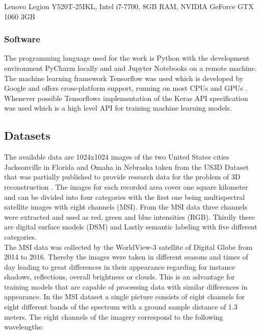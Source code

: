 Lenovo Legion Y520T-25IKL, Intel i7-7700, 8GB RAM, NVIDIA GeForce GTX 1060 3GB

\subsubsection{Software}

The programming language used for the work is Python with the development environment PyCharm locally
and and Jupyter Notebooks on a remote machine. The machine learning framework Tensorflow was used which
is developed by Google and offers cross-platform support, running on most CPUs and GPUs \parencite{tensorflow}.
Whenever possible Tensorflows implementation of the Keras API specification was used which is a high level API
for training machine learning models.

\subsection{Datasets} \label{datasets}

The available data are 1024x1024 images of the two United States cities Jacksonville
in Florida and Omaha in Nebraska taken from the US3D Dataset that
was partially published to provide research data for the problem
of 3D reconstruction \parencite{2019-bosch-semantic}.
The images for each recorded area cover one square kilometer and can be divided 
into four categories with the first one being multispectral satellite images with eight channels (MSI). 
From the MSI data three channels were extracted and used as red, green and blue intensities (RGB). 
Thirdly there are digital surface models (DSM) and Lastly semantic labeling with five different categories. \\

The MSI data was collected by the WorldView-3 satellite of Digital Globe from 2014 to 2016.
Thereby the images were taken in different seasons and times of day leading to great differences
in their appearance regarding for instance shadows, reflections, overall brightness or clouds.
This is an advantage for training models that are capable of processing data with similar differences in 
appearance.
In the MSI dataset a single picture consists of eight channels for eight different bands of the spectrum with
a ground sample distance of 1.3 meters. The eight channels of the imagery correspond to the following wavelengths:

